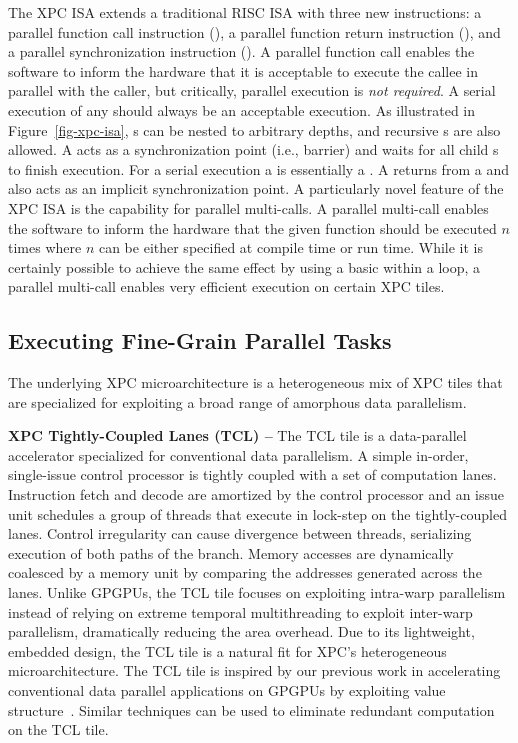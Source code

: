 The XPC ISA extends a traditional RISC ISA with three new instructions: a
parallel function call instruction (), a parallel function
return instruction (), and a parallel synchronization
instruction (). A parallel function call enables the software
to inform the hardware that it is acceptable to execute the callee in
parallel with the caller, but critically, parallel execution is \emph{not
  required}. A serial execution of any  should always be an
acceptable execution. As illustrated in Figure~\ref{fig-xpc-isa},
s can be nested to arbitrary depths, and recursive s
are also allowed. A  acts as a synchronization point (i.e.,
barrier) and waits for all child s to finish execution. For a
serial execution a  is essentially a . A 
returns from a  and also acts as an implicit synchronization
point. A particularly novel feature of the XPC ISA is the capability for
parallel multi-calls. A parallel multi-call enables the software to
inform the hardware that the given function should be executed $n$ times
where $n$ can be either specified at compile time or run time. While it
is certainly possible to achieve the same effect by using a basic
 within a loop, a parallel multi-call enables very efficient
execution on certain XPC tiles.

\subsection{Executing Fine-Grain Parallel Tasks}

The underlying XPC microarchitecture is a heterogeneous mix of XPC tiles
that are specialized for exploiting a broad range of amorphous data
parallelism.

\textbf{XPC Tightly-Coupled Lanes (TCL) --} The TCL tile is a
data-parallel accelerator specialized for conventional data parallelism. A
simple in-order, single-issue control processor is tightly coupled with a set
of computation lanes. Instruction fetch and decode are
amortized by the control processor and an issue unit schedules a group of
threads that execute in lock-step on the tightly-coupled lanes. Control
irregularity can cause divergence between threads, serializing execution
of both paths of the branch. Memory accesses are dynamically coalesced by
a memory unit by comparing the addresses generated across the
lanes. Unlike GPGPUs, the TCL tile focuses on exploiting intra-warp
parallelism instead of relying on extreme temporal multithreading to
exploit inter-warp parallelism, dramatically reducing the area
overhead. Due to its lightweight, embedded design, the TCL tile is a
natural fit for XPC's heterogeneous microarchitecture. The TCL tile is
inspired by our previous work in accelerating conventional data parallel
applications on GPGPUs by exploiting value
structure~\cite{kim-simt-vstruct-isca2013}. Similar techniques can be
used to eliminate redundant computation on the TCL tile.

